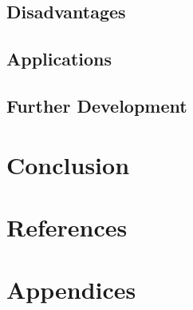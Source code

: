 \documentclass[11pt]{article}
\begin{document}
\subsection{Disadvantages}
\subsection{Applications}
\subsection{Further Development}

\section{Conclusion}


\clearpage
\section{References}
\printbibliography[heading=none]
\clearpage

\section{Appendices}
\end{document}
